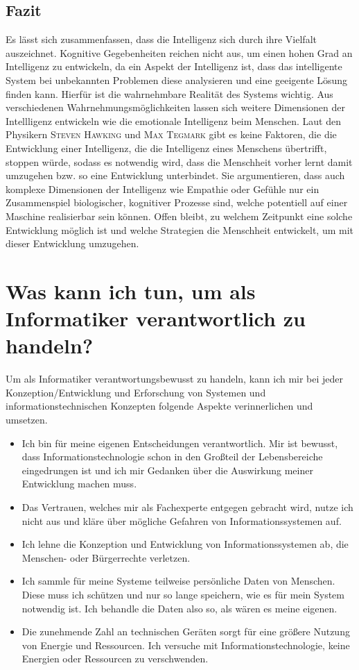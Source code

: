 \documentclass[a4paper, 11pt]{scrartcl}
\begin{document}
\subsection{Fazit}
Es lässt sich zusammenfassen, dass die Intelligenz sich durch ihre Vielfalt auszeichnet. Kognitive Gegebenheiten reichen nicht aus, um einen hohen Grad an Intelligenz zu entwickeln, da ein Aspekt der Intelligenz ist, dass das intelligente System bei unbekannten Problemen diese analysieren und eine geeigente Lösung finden kann. Hierfür ist die wahrnehmbare Realität des Systems wichtig. Aus verschiedenen Wahrnehmungsmöglichkeiten lassen sich weitere Dimensionen der Intellligenz entwickeln wie die emotionale Intelligenz beim Menschen. Laut den Physikern \textsc{Steven Hawking} und \textsc{Max Tegmark} gibt es keine Faktoren, die die Entwicklung einer Intelligenz, die die Intelligenz eines Menschens übertrifft, stoppen würde, sodass es notwendig wird, dass die Menschheit vorher lernt damit umzugehen bzw. so eine Entwicklung unterbindet. Sie argumentieren, dass auch komplexe Dimensionen der Intelligenz wie Empathie oder Gefühle nur ein Zusammenspiel biologischer, kognitiver Prozesse sind, welche potentiell auf einer Maschine realisierbar sein können. Offen bleibt, zu welchem Zeitpunkt eine solche Entwicklung möglich ist und welche Strategien die Menschheit entwickelt, um mit dieser Entwicklung umzugehen.

\newpage



\section{Was kann ich tun, um als Informatiker verantwortlich zu handeln?}
Um als Informatiker verantwortungsbewusst zu handeln, kann ich mir bei jeder Konzeption/Entwicklung und Erforschung von Systemen und informationstechnischen Konzepten folgende Aspekte verinnerlichen und umsetzen.
\begin{itemize}
  \item Ich bin für meine eigenen Entscheidungen verantwortlich. Mir ist bewusst, dass Informationstechnologie schon in den Großteil der Lebensbereiche eingedrungen ist und ich mir Gedanken über die Auswirkung meiner Entwicklung machen muss.
  \item Das Vertrauen, welches mir als Fachexperte entgegen gebracht wird, nutze ich nicht aus und kläre über mögliche Gefahren von Informationssystemen auf.
  \item Ich lehne die Konzeption und Entwicklung von Informationssystemen ab, die Menschen- oder Bürgerrechte verletzen.
  \item Ich sammle für meine Systeme teilweise persönliche Daten von Menschen. Diese muss ich schützen und nur so lange speichern, wie es für mein System notwendig ist. Ich behandle die Daten also so, als wären es meine eigenen.
  \item Die zunehmende Zahl an technischen Geräten sorgt für eine größere Nutzung von Energie und Ressourcen. Ich versuche mit Informationstechnologie, keine Energien oder Ressourcen zu verschwenden.
\end{itemize}
\end{document}
